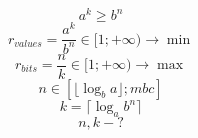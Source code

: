 \documentclass{minimal}
\begin{document}
$$a^k \geq b^n$$
$$r_{values} = \frac{a^k}{b^n} \in [1; +\infty) \rightarrow \min$$
$$r_{bits} = \frac{n}{k} \in [1; +\infty) \rightarrow \max$$
$$n \in [\lfloor \log_b a \rfloor; mbc]$$
$$k = \lceil \log_a b^n \rceil$$
$$n, k - ?$$
\end{document}
